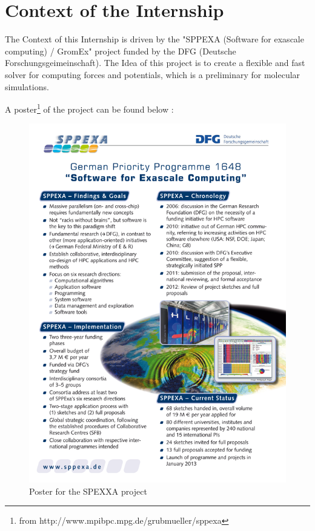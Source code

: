 \documentclass[11pt,twoside,a4paper]{report}
\begin{document}
\chapter{Context of the Internship}

The Context of this Internship is driven by the "SPPEXA (Software for exascale computing) / GromEx" project funded by the DFG (Deutsche Forschungsgeimeinschaft).
The Idea of this project is to create a flexible and fast solver for computing forces and potentials, which is a preliminary for molecular simulations.

A poster\footnote{from http://www.mpibpc.mpg.de/grubmueller/sppexa}   of the project can be found below :

\begin{figure}[H]
\includegraphics[scale=2]{sppexa-poster}
 \centering 
\caption{Poster for the SPEXXA project}
\label{fig:poster}
\end{figure}
\end{document}

